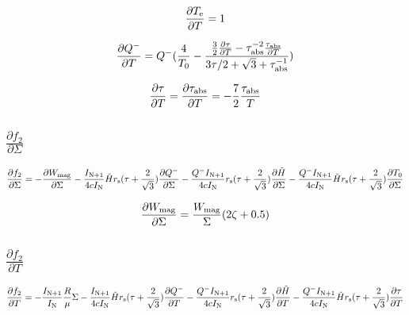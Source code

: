 \documentclass[11pt, oneside]{article}   	%
\begin{document}
\begin{equation}
	\frac{\partial T_{\rm e}}{\partial T} = 1
\end{equation}

\begin{equation}
	\frac{\partial Q^-}{\partial T} = Q^-(\frac{4}{T_0} - \frac{\frac{3}{2}\frac{\partial\tau}{\partial T}-\tau^{-2}_{\rm abs}\frac{\tau_{\rm abs}}{\partial T}}{3\tau/2 + \sqrt{3} + \tau_{\rm abs}^{-1}})
\end{equation}

\begin{equation}
	\frac{\partial\tau}{\partial T} = \frac{\partial\tau_{\rm abs}}{\partial T} = -\frac{7}{2}\frac{\tau_{\rm abs}}{T}
\end{equation}
	
\subsection*{$\displaystyle\frac{\partial f_2}{\partial\Sigma}$}
\begin{equation}
	\frac{\partial f_2}{\partial\Sigma} = -\frac{\partial W_{\rm mag}}{\partial \Sigma} - \frac{I_{\rm N+1}}{4cI_{\rm N}}\tilde Hr_{\rm s}(\tau+\frac{2}{\sqrt{3}})\frac{\partial Q^-}{\partial \Sigma} - \frac{Q^-I_{\rm N+1}}{4cI_{\rm N}}r_{\rm s}(\tau+\frac{2}{\sqrt{3}})\frac{\partial\tilde H}{\partial \Sigma} - \frac{Q^-I_{\rm N+1}}{4cI_{\rm N}}\tilde Hr_{\rm s}(\tau+\frac{2}{\sqrt{3}})\frac{\partial T_0}{\partial \Sigma}
\end{equation}

\begin{equation}
	\frac{\partial W_{\rm mag}}{\partial \Sigma} = \frac{W_{\rm mag}}{\Sigma}(2\zeta+0.5)
\end{equation}

\subsection*{$\displaystyle\frac{\partial f_2}{\partial T}$}
\begin{equation}
	\frac{\partial f_2}{\partial T} = -\frac{I_{\rm N+1}}{I_{\rm N}}\frac{R}{\mu}\Sigma - \frac{I_{\rm N+1}}{4cI_{\rm N}}\tilde Hr_{\rm s}(\tau+\frac{2}{\sqrt{3}})\frac{\partial Q^-}{\partial T}  -  \frac{Q^-I_{\rm N+1}}{4cI_{\rm N}}r_{\rm s}(\tau+\frac{2}{\sqrt{3}})\frac{\partial\tilde H}{\partial T}  -  \frac{Q^-I_{\rm N+1}}{4cI_{\rm N}}\tilde Hr_{\rm s}(\tau+\frac{2}{\sqrt{3}})\frac{\partial\tau}{\partial T} 
\end{equation} 
\end{document}
